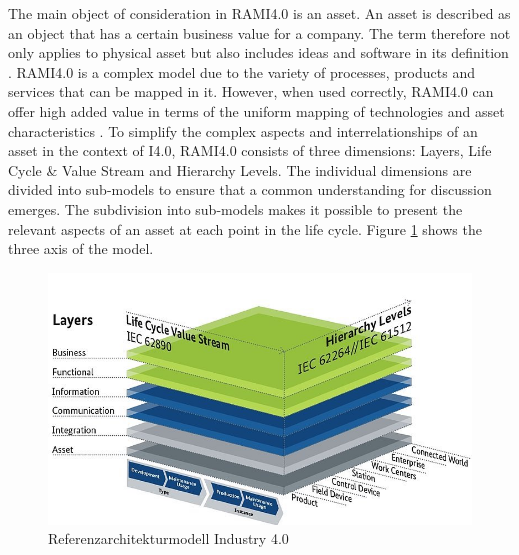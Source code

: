 The main object of consideration in \ac{RAMI4.0} is an asset. An asset is described as an object that has a certain business value for a company. The term therefore not only applies to physical asset but also includes ideas and software in its definition \cite[p. 31]{Heidel2017ReferenzarchitekturmodellIndustrie4.0Komponente}. \ac{RAMI4.0} is a complex model due to the variety of processes, products and services that can be mapped in it. However, when used correctly, \ac{RAMI4.0} can offer high added value in terms of the uniform mapping of technologies and asset characteristics \cite[p. 23]{Arnold2018DigitaleMittelstand}. To simplify the complex aspects and interrelationships of an asset in the context of \ac{I4.0}, \ac{RAMI4.0} consists of three dimensions: Layers, Life Cycle \& Value Stream and Hierarchy Levels. The individual dimensions are divided into sub-models to ensure that a common understanding for discussion emerges. The subdivision into sub-models makes it possible to present the relevant aspects of an asset at each point in the life cycle. Figure \ref{fig:rami40} shows the three axis of the model. 

\begin{figure}[h]
\includegraphics[scale=0.5]{content/pictures/rami_4.0_zvei.jpg}
\caption{Referenzarchitekturmodell Industry 4.0}
\label{fig:rami40}
\end{figure}

